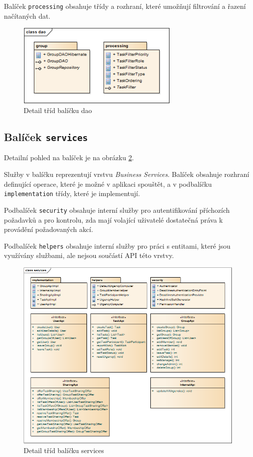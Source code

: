 \documentclass[thesis=B,czech]{FITthesis}[2012/06/26]
\begin{document}
			Balíček \texttt{processing} obsahuje třídy a rozhraní, které umožňují filtrování a řazení načítaných dat.
			
			\begin{figure}\centering
				\includegraphics[width=0.7\textwidth]{ea-diagrams/packages/dao.png}
				\caption[Balíček dao]{Detail tříd balíčku dao}
				\label{diagram:package-dao}
			\end{figure}
				
		\subsection{Balíček \texttt{services}}
			Detailní pohled na balíček je na obrázku \ref{diagram:package-services}. 
			
			Služby v balíčku reprezentují vrstvu \textit{Business Services}. Balíček obsahuje rozhraní definující operace, které je možné v aplikaci spouštět, a v podbalíčku \texttt{implementation} třídy, které je implementují.
			
			Podbalíček \texttt{security} obsahuje interní služby pro autentifikování příchozích požadavků a pro kontrolu, zda mají volající uživatelé dostatečná práva k provádění požadovaných akcí.
			
			Podbalíček \texttt{helpers} obsahuje interní služby pro práci s entitami, které jsou využívány službami, ale nejsou součástí API této vrstvy.
			
			\begin{figure}\centering
				\includegraphics[width=1\textwidth]{ea-diagrams/packages/services.png}
				\caption[Balíček services]{Detail tříd balíčku services}
				\label{diagram:package-services}
			\end{figure}
			
\end{document}
